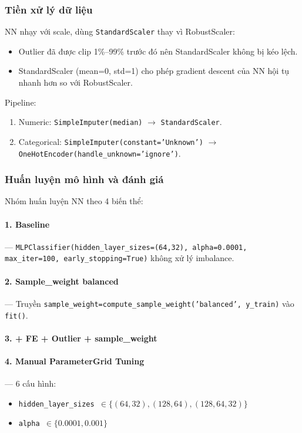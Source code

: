 \documentclass[12pt, a4paper]{article}
\begin{document}
\subsubsection{Tiền xử lý dữ liệu}

NN nhạy với scale, dùng \texttt{StandardScaler} thay vì RobustScaler:

\begin{itemize}
    \item Outlier đã được clip 1\%--99\% trước đó nên StandardScaler không bị kéo lệch.
    \item StandardScaler (mean=0, std=1) cho phép gradient descent của NN hội tụ nhanh hơn so với RobustScaler.
\end{itemize}

Pipeline:
\begin{enumerate}
    \item Numeric: \texttt{SimpleImputer(median)} $\to$ \texttt{StandardScaler}.
    \item Categorical: \texttt{SimpleImputer(constant='Unknown')} $\to$ \texttt{OneHotEncoder(handle\_unknown='ignore')}.
\end{enumerate}

\subsubsection{Huấn luyện mô hình và đánh giá}

Nhóm huấn luyện NN theo 4 biến thể:

\paragraph{1. Baseline} --- \texttt{MLPClassifier(hidden\_layer\_sizes=(64,32), alpha=0.0001, max\_iter=100, early\_stopping=True)} không xử lý imbalance.

\paragraph{2. Sample\_weight balanced} --- Truyền \texttt{sample\_weight=compute\_sample\_weight('balanced', y\_train)} vào \texttt{fit()}.

\paragraph{3. + FE + Outlier + sample\_weight}

\paragraph{4. Manual ParameterGrid Tuning} --- 6 cấu hình:
\begin{itemize}
    \item \texttt{hidden\_layer\_sizes $\in \{(64,32), (128,64), (128,64,32)\}$}
    \item \texttt{alpha $\in \{0.0001, 0.001\}$}
\end{itemize}
\end{document}
